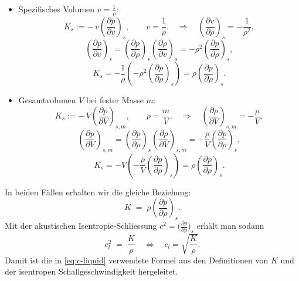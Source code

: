 \begin{itemize}
    \item Spezifisches Volumen $v = \frac{1}{\rho}$:
    \[
    K_s := -\,v\left(\frac{\partial p}{\partial v}\right)_{s},\qquad v=\frac{1}{\rho}.
    \quad\Rightarrow\quad
    \left(\frac{\partial v}{\partial \rho}\right)_{s} = -\frac{1}{\rho^2},
    \]
    \[
    \left(\frac{\partial p}{\partial v}\right)_{s}
    = \left(\frac{\partial p}{\partial \rho}\right)_{s}\left(\frac{\partial \rho}{\partial v}\right)_{s}
    = -\rho^2\left(\frac{\partial p}{\partial \rho}\right)_{s},
    \]
    \[
    K_s = -\frac{1}{\rho}\left(-\rho^2\left(\frac{\partial p}{\partial \rho}\right)_{s}\right)
    = \rho\left(\frac{\partial p}{\partial \rho}\right)_{s}.
    \]

\item Gesamtvolumen $V$ bei fester Masse $m$:
    \[
    K_s := -\,V\left(\frac{\partial p}{\partial V}\right)_{s,m},\qquad \rho=\frac{m}{V}.
    \quad\Rightarrow\quad
    \left(\frac{\partial \rho}{\partial V}\right)_{s,m} = -\frac{\rho}{V},
    \]
    \[
    \left(\frac{\partial p}{\partial V}\right)_{s,m}
    = \left(\frac{\partial p}{\partial \rho}\right)_{s}\left(\frac{\partial \rho}{\partial V}\right)_{s,m}
    = -\frac{\rho}{V}\left(\frac{\partial p}{\partial \rho}\right)_{s},
    \]
    \[
    K_s = -V\left(-\frac{\rho}{V}\left(\frac{\partial p}{\partial \rho}\right)_{s}\right)
    = \rho\left(\frac{\partial p}{\partial \rho}\right)_{s}.
    \]
\end{itemize}
In beiden Fällen erhalten wir die gleiche Beziehung:
\begin{equation}
    K \;=\; \rho\left(\frac{\partial p}{\partial \rho}\right)_{s}.
\end{equation}
Mit der akustischen Isentropie-Schliessung $c^2=\big(\frac{\partial p}{\partial \rho}\big)_s$
erhält man sodann
\begin{equation}
    c_l^2 \;=\; \frac{K}{\rho} \quad \Leftrightarrow \quad c_l=\sqrt{\frac{K}{\rho}}.
\end{equation}
Damit ist die in \eqref{eq:c-liquid} verwendete Formel aus den Definitionen von $K$
und der isentropen Schallgeschwindigkeit hergeleitet.

